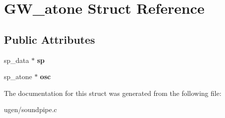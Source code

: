 \hypertarget{structGW__atone}{}\section{G\+W\+\_\+atone Struct Reference}
\label{structGW__atone}
\subsection*{Public Attributes}
\begin{DoxyCompactItemize}
\item 
\hypertarget{structGW__atone_a2277c2f536c432d059cbec5fbe0ec9ce}{}\label{structGW__atone_a2277c2f536c432d059cbec5fbe0ec9ce} 
sp\+\_\+data $\ast$ {\bfseries sp}
\item 
\hypertarget{structGW__atone_a4c74e158c7512e2c6b54321fcdfa7c2f}{}\label{structGW__atone_a4c74e158c7512e2c6b54321fcdfa7c2f} 
sp\+\_\+atone $\ast$ {\bfseries osc}
\end{DoxyCompactItemize}


The documentation for this struct was generated from the following file\+:\begin{DoxyCompactItemize}
\item 
ugen/soundpipe.\+c\end{DoxyCompactItemize}

